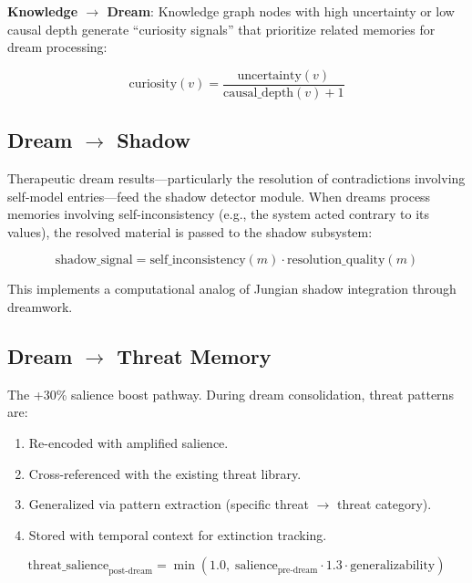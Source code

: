 \documentclass[11pt,a4paper]{article}
\begin{document}
\textbf{Knowledge $\to$ Dream}: Knowledge graph nodes with high uncertainty or low causal depth generate ``curiosity signals'' that prioritize related memories for dream processing:

\begin{equation}
\text{curiosity}(v) = \frac{\text{uncertainty}(v)}{\text{causal\_depth}(v) + 1}
\end{equation}

\subsection{Dream $\to$ Shadow}

Therapeutic dream results---particularly the resolution of contradictions involving self-model entries---feed the shadow detector module. When dreams process memories involving self-inconsistency (e.g., the system acted contrary to its values), the resolved material is passed to the shadow subsystem:

\begin{equation}
\text{shadow\_signal} = \text{self\_inconsistency}(m) \cdot \text{resolution\_quality}(m)
\end{equation}

This implements a computational analog of Jungian shadow integration through dreamwork.

\subsection{Dream $\to$ Threat Memory}

The +30\% salience boost pathway. During dream consolidation, threat patterns are:

\begin{enumerate}[nosep]
    \item Re-encoded with amplified salience.
    \item Cross-referenced with the existing threat library.
    \item Generalized via pattern extraction (specific threat $\to$ threat category).
    \item Stored with temporal context for extinction tracking.
\end{enumerate}

\begin{equation}
\text{threat\_salience}_{\text{post-dream}} = \min(1.0, \; \text{salience}_{\text{pre-dream}} \cdot 1.3 \cdot \text{generalizability})
\end{equation}
\end{document}
